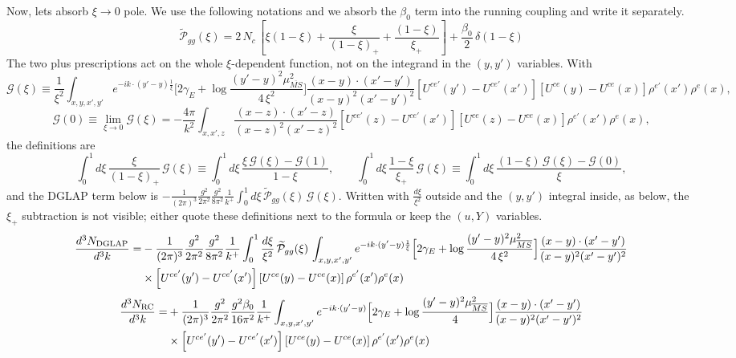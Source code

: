 \documentclass[9pt]{article}
\newcommand{\chg}[1]{{\color{red}#1}}
\numberwithin{equation}{section}
\begin{document}
Now, lets absorb $\xi\to 0$ pole. We use the following notations and we absorb the $\beta_{0}$ term into the running coupling and write it separately.
$$\widetilde{\mathcal{P}}_{gg}(\xi) = 2\,N_{c}\,\left[\xi(1-\xi) + \frac{\xi}{(1-\xi)_{+}} + \frac{(1-\xi)}{\xi_{+}}\right]+\frac{\beta_{0}}{2}\,\delta(1-\xi) $$
\chg{The two plus prescriptions act on the whole $\xi$-dependent function, not on the integrand in the $(y,y')$ variables. With
$$\mathcal{G}(\xi)\equiv\frac{1}{\xi^{2}}\int_{x,y,x',y'}e^{-ik\cdot(y'-y)\frac{1}{\xi}}\Big[2\gamma_{E}+\log\frac{(y'-y)^{2}\mu^{2}_{\overline{MS}}}{4\,\xi^{2}}\Big]\frac{(x-y)\cdot(x'-y')}{(x-y)^{2}(x'-y')^{2}}\left[U^{ce'}(y') - U^{ce'}(x')\right]\left[U^{ce}(y) - U^{ce}(x)\right]\rho^{e'}(x')\rho^{e}(x),$$
$$\mathcal{G}(0)\equiv\lim_{\xi\to0}\mathcal{G}(\xi)=-\frac{4\pi}{k^{2}}\int_{x,x',z}\frac{(x-z)\cdot(x'-z)}{(x-z)^{2}(x'-z)^{2}}\left[U^{ce'}(z) - U^{ce'}(x')\right]\left[U^{ce}(z) - U^{ce}(x)\right]\rho^{e'}(x')\rho^{e}(x),$$
the definitions are
$$\int_{0}^{1}d\xi\,\frac{\xi}{(1-\xi)_{+}}\,\mathcal{G}(\xi)\equiv\int_{0}^{1}d\xi\,\frac{\xi\,\mathcal{G}(\xi)-\mathcal{G}(1)}{1-\xi},\qquad
\int_{0}^{1}d\xi\,\frac{1-\xi}{\xi_{+}}\,\mathcal{G}(\xi)\equiv\int_{0}^{1}d\xi\,\frac{(1-\xi)\,\mathcal{G}(\xi)-\mathcal{G}(0)}{\xi},$$
and the DGLAP term below is $-\frac{1}{(2\pi)^{3}}\frac{g^{2}}{2\pi^{2}}\frac{g^{2}}{8\pi^{2}}\frac{1}{k^{+}}\int_{0}^{1}d\xi\,\widetilde{\mathcal P}_{gg}(\xi)\,\mathcal{G}(\xi)$. Written with $\frac{d\xi}{\xi^{2}}$ outside and the $(y,y')$ integral inside, as below, the $\xi_{+}$ subtraction is not visible; either quote these definitions next to the formula or keep the $(u,Y)$ variables.}
\begin{align}
\frac{d^{3}N_{\rm DGLAP}}{d^{3}k}= &-\frac{1}{(2\pi)^{3}}\frac{g^{2}}{2\pi^{2}}\frac{g^{2}}{8\pi^{2}}\frac{1}{k^{+}}\int_{0}^{1}\frac{d\xi}{\xi^{2}}\,\widetilde{\mathcal P}_{gg}(\xi)\,\int_{x,y,x',y'}e^{-ik\cdot(y'-y)\frac{1}{\xi}}\Big[2\gamma_{E}+\log\frac{(y'-y)^{2}\mu^{2}_{\overline{MS}}}{4\,\xi^{2}}\Big]\frac{(x-y)\cdot(x'-y')}{(x-y)^{2}(x'-y')^{2}}\notag\\
&\times\left[U^{ce'}(y') - U^{ce'}(x')\right]\left[U^{ce}(y) - U^{ce}(x)\right]\rho^{e'}(x')\rho^{e}(x)
\end{align}
\begin{align}
\frac{d^{3}N_{\rm RC}}{d^{3}k}= & +\frac{1}{(2\pi)^{3}}\frac{g^{2}}{2\pi^{2}}\frac{g^{2}\beta_{0}}{16\pi^{2}}\frac{1}{k^{+}}\int_{x,y,x',y'}e^{-ik\cdot(y'-y)}\Big[2\gamma_{E}+\log\frac{(y'-y)^{2}\mu^{2}_{\overline{MS}}}{4}\Big]\frac{(x-y)\cdot(x'-y')}{(x-y)^{2}(x'-y')^{2}}\notag\\
&\times\left[U^{ce'}(y') - U^{ce'}(x')\right]\left[U^{ce}(y) - U^{ce}(x)\right]\rho^{e'}(x')\rho^{e}(x)
\end{align}
\end{document}
